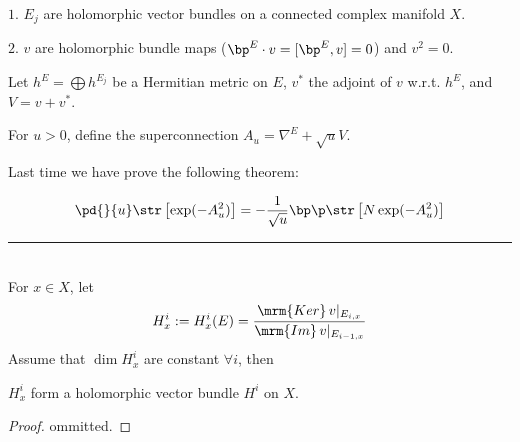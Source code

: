 \noindent$1.$ $E_j$ are holomorphic vector bundles on a 
connected complex manifold $X$.

\noindent$2.$ $v$ are holomorphic bundle maps
($\bp^E\cdot v=[\bp^E,v]=0$) and $v^2=0$.

Let $h^E=\bigoplus h^{E_j}$ be a Hermitian metric on $E$, 
$v^*$ the adjoint of $v$ w.r.t. $h^E$, and $V=v+v^*$. 

For $u>0$, define the superconnection $A_u=\nabla^E+\sqrt{u}V$. 

Last time we have prove the following theorem:
\begin{theorem}
    \begin{equation*}
    \pd{}{u}\str\left[\exp(-A_u^2)\right]
    =-\frac{1}{\sqrt{u}}\bp\p\str\left[N\exp(-A_u^2)\right]
    \end{equation*}
\end{theorem}

\hrule ~\\

For $x\in X$, let 
\begin{equation*}
    H^i_x:=H^i_x(E)=
    \frac{\mrm{Ker}\,v|_{E_{i,x}}}{\mrm{Im}\,v|_{E_{i-1,x}}}
\end{equation*}
Assume that $\dim H^i_x$ are constant $\forall i$, then
\begin{proposition}
    $H^i_x$ form a holomorphic vector bundle $H^i$ on $X$.
\end{proposition}
\begin{proof}
    ommitted.
\end{proof}
